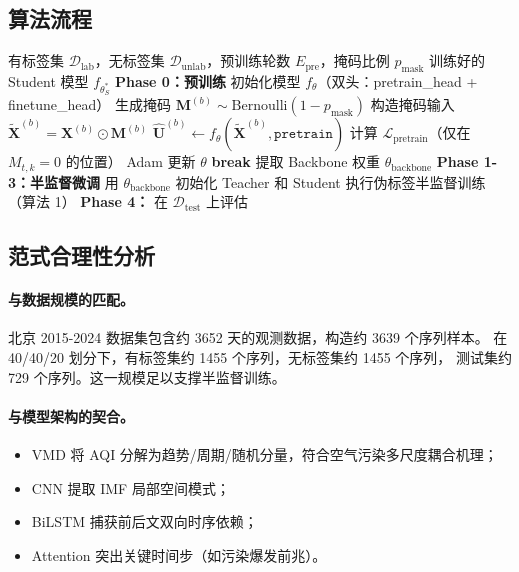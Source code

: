 \documentclass[11pt,a4paper]{article}
\newcommand{\mat}[1]{\bm{#1}}
\begin{document}
\subsection{算法流程}
\begin{algorithm}[ht]
\caption{预训练-微调半监督训练流程}
\begin{algorithmic}[1]
\REQUIRE 有标签集 $\mathcal{D}_{\text{lab}}$，无标签集 $\mathcal{D}_{\text{unlab}}$，预训练轮数 $E_{\text{pre}}$，掩码比例 $p_{\text{mask}}$
\ENSURE 训练好的 Student 模型 $f_{\theta_S^*}$
\STATE \textbf{Phase 0：预训练}
\STATE 初始化模型 $f_{\theta}$（双头：pretrain\_head + finetune\_head）
  \FOR{每个 batch $\mat{X}^{(b)} \in \mathcal{D}_{\text{unlab}}$}
    \STATE 生成掩码 $\mat{M}^{(b)} \sim \text{Bernoulli}(1 - p_{\text{mask}})$
    \STATE 构造掩码输入 $\widetilde{\mat{X}}^{(b)} = \mat{X}^{(b)} \odot \mat{M}^{(b)}$
    \STATE $\widehat{\mat{U}}^{(b)} \gets f_{\theta}(\widetilde{\mat{X}}^{(b)}, \texttt{pretrain})$
    \STATE 计算 $\mathcal{L}_{\text{pretrain}}$（仅在 $M_{t,k} = 0$ 的位置）
    \STATE Adam 更新 $\theta$
  \ENDFOR
    \STATE \textbf{break}
  \ENDIF
\ENDFOR
\STATE 提取 Backbone 权重 $\theta_{\text{backbone}}$
\STATE \textbf{Phase 1-3：半监督微调}
\STATE 用 $\theta_{\text{backbone}}$ 初始化 Teacher 和 Student
\STATE 执行伪标签半监督训练（算法 1）
\STATE \textbf{Phase 4：} 在 $\mathcal{D}_{\text{test}}$ 上评估
\end{algorithmic}
\end{algorithm}

\subsection{范式合理性分析}

\paragraph{与数据规模的匹配。}
北京 2015-2024 数据集包含约 3652 天的观测数据，构造约 3639 个序列样本。
在 40/40/20 划分下，有标签集约 1455 个序列，无标签集约 1455 个序列，
测试集约 729 个序列。这一规模足以支撑半监督训练。

\paragraph{与模型架构的契合。}
\begin{itemize}[leftmargin=*]
  \item VMD 将 AQI 分解为趋势/周期/随机分量，符合空气污染多尺度耦合机理；
  \item CNN 提取 IMF 局部空间模式；
  \item BiLSTM 捕获前后文双向时序依赖；
  \item Attention 突出关键时间步（如污染爆发前兆）。
\end{itemize}
\end{document}
